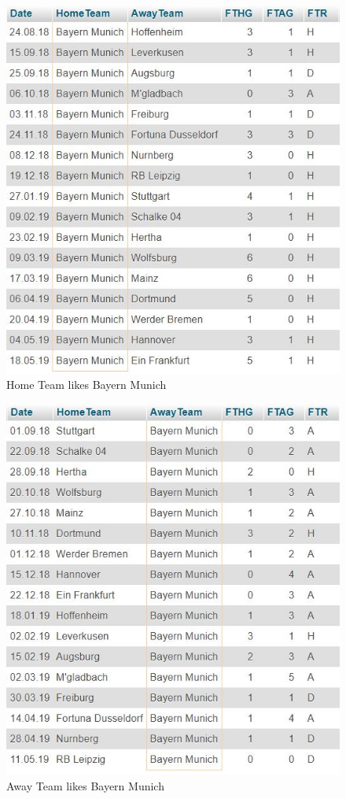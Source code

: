 \documentclass[11pt, journal]{IEEEtran}
\begin{document}
\begin{figure}[htb]
	\centering
		\includegraphics[width=1.0\columnwidth]{images/home}
	\caption{Home Team likes Bayern Munich}
	\label{fig:probov}
\end{figure}\begin{figure}[htb]
	\centering
		\includegraphics[width=1.0\columnwidth]{images/away}
	\caption{Away Team likes Bayern Munich}
	\label{fig:probov}
\end{figure} 
\end{document}
